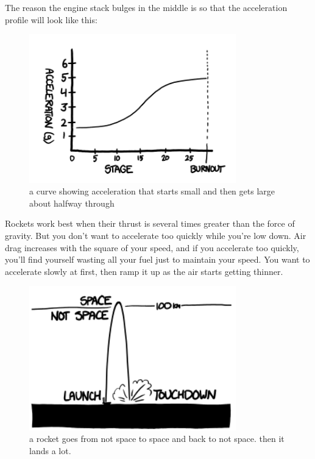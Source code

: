 {The reason the engine stack bulges in the middle is so that the acceleration profile will look like this:}

\begin{figure}[!htbp]
\centering
\includegraphics[scale=0.5, max width=0.8\textwidth]{imgs/a/24/model_acceleration.png}
\caption{a curve showing acceleration that starts small and then gets large about halfway through}
\end{figure}

{Rockets work best when their thrust is several times greater than the force of gravity. But you don’t want to accelerate too quickly while you’re low down. Air drag increases with the square of your speed, and if you accelerate too quickly, you’ll find yourself wasting all your fuel just to maintain your speed. You want to accelerate slowly at first, then ramp it up as the air starts getting thinner.}

\begin{figure}[!htbp]
\centering
\includegraphics[scale=0.5, max width=0.8\textwidth]{imgs/a/24/model_space.png}
\caption{a rocket goes from not space to space and back to not space. then it lands a lot.}
\end{figure}


